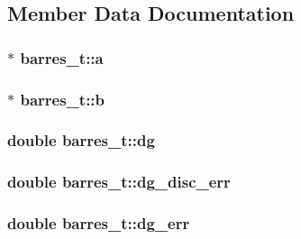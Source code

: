 \subsection{\-Member \-Data \-Documentation}
\hypertarget{structbarres__t_a3eee391c04ae6550b8ffb6db6b7d560e}{
\subsubsection[{a}]{$\ast$ {\bf barres\-\_\-t\-::a}}}\label{structbarres__t_a3eee391c04ae6550b8ffb6db6b7d560e}
\hypertarget{structbarres__t_aadf370b83d7efc908b257971cefbfeec}{
\subsubsection[{b}]{ $\ast$ {\bf barres\-\_\-t\-::b}}}\label{structbarres__t_aadf370b83d7efc908b257971cefbfeec}
\hypertarget{structbarres__t_ad51313ffddd69578d5c682350d2923f8}{
\subsubsection[{dg}]{\setlength{\rightskip}{0pt plus 5cm}double {\bf barres\-\_\-t\-::dg}}}\label{structbarres__t_ad51313ffddd69578d5c682350d2923f8}
\hypertarget{structbarres__t_a26fd2829088aa3e1e3133f20caa64375}{
\subsubsection[{dg\-\_\-disc\-\_\-err}]{\setlength{\rightskip}{0pt plus 5cm}double {\bf barres\-\_\-t\-::dg\-\_\-disc\-\_\-err}}}\label{structbarres__t_a26fd2829088aa3e1e3133f20caa64375}
\hypertarget{structbarres__t_a3253b9a6733ca4e28305d3e7db548355}{
\subsubsection[{dg\-\_\-err}]{\setlength{\rightskip}{0pt plus 5cm}double {\bf barres\-\_\-t\-::dg\-\_\-err}}}\label{structbarres__t_a3253b9a6733ca4e28305d3e7db548355}
